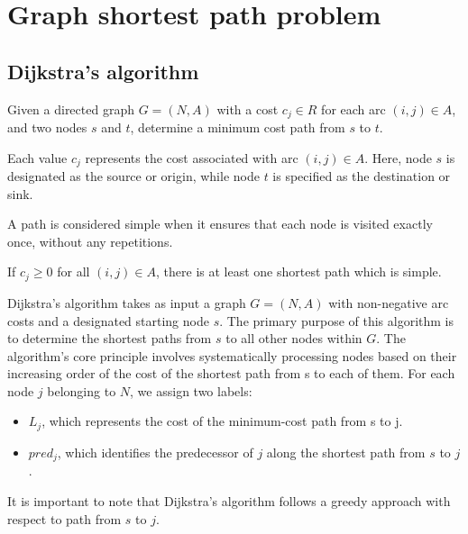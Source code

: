 \section{Graph shortest path problem}

\subsection{Dijkstra's algorithm}
Given a directed graph $G=(N,A)$ with a cost $c_j \in R$ for each arc $(i,j) \in A$, and two nodes $s$ and $t$, determine a minimum cost path from $s$ to $t$. 

Each value $c_j$ represents the cost associated with arc $(i,j) \in A$. 
Here, node $s$ is designated as the source or origin, while node $t$ is specified as the destination or sink.
\begin{definition}
    A path is considered simple when it ensures that each node is visited exactly once, without any repetitions.
\end{definition}
\begin{property}
    If $c_j \geq 0$ for all $(i,j) \in A$, there is at least one shortest path which is simple. 
\end{property}
Dijkstra's algorithm takes as input a graph $G = (N, A)$ with non-negative arc costs and a designated starting node $s$. 
The primary purpose of this algorithm is to determine the shortest paths from $s$ to all other nodes within $G$.
The algorithm's core principle involves systematically processing nodes based on their increasing order of the cost of the shortest path from s to each of them. 
For each node $j$ belonging to $N$, we assign two labels:
\begin{itemize}
    \item $L_j$, which represents the cost of the minimum-cost path from s to j.
    \item $pred_j$, which identifies the predecessor of $j$ along the shortest path from $s$ to $j$.
\end{itemize} 
It is important to note that Dijkstra's algorithm follows a greedy approach with respect to path from $s$ to $j$. 
